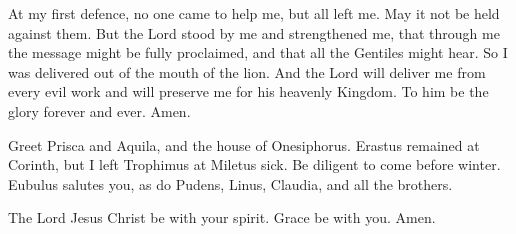  At my first defence, no one came to help me, but all left
me. May it not be held against them.  But the Lord stood by
me and strengthened me, that through me the message might be fully
proclaimed, and that all the Gentiles might hear. So I was delivered out
of the mouth of the lion.  And the Lord will deliver me
from every evil work and will preserve me for his heavenly Kingdom. To
him be the glory forever and ever. Amen.

 Greet Prisca and Aquila, and the house of Onesiphorus.
 Erastus remained at Corinth, but I left Trophimus at
Miletus sick.  Be diligent to come before winter. Eubulus
salutes you, as do Pudens, Linus, Claudia, and all the brothers.

 The Lord Jesus Christ be with your spirit. Grace be with
you. Amen.
